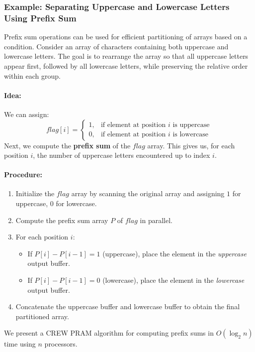 \documentclass[12pt]{book}
\begin{document}
\subsubsection{Example: Separating Uppercase and Lowercase Letters Using Prefix Sum}
Prefix sum operations can be used for efficient partitioning of arrays based on a condition.  
Consider an array of characters containing both uppercase and lowercase letters. The goal is to rearrange the array so that all uppercase letters appear first, followed by all lowercase letters, while preserving the relative order within each group.

\paragraph{Idea:}
We can assign:
\[
flag[i] =
\begin{cases}
1, & \text{if element at position $i$ is uppercase}\\
0, & \text{if element at position $i$ is lowercase}
\end{cases}
\]
Next, we compute the \textbf{prefix sum} of the $flag$ array. This gives us, for each position $i$, the number of uppercase letters encountered up to index $i$.

\paragraph{Procedure:}
\begin{enumerate}
    \item Initialize the $flag$ array by scanning the original array and assigning $1$ for uppercase, $0$ for lowercase.
    \item Compute the prefix sum array $P$ of $flag$ in parallel.
    \item For each position $i$:
        \begin{itemize}
            \item If $P[i]-P[i-1] = 1$ (uppercase), place the element in the \textit{uppercase} output buffer.
            \item If $P[i]-P[i-1] = 0$ (lowercase), place the element in the \textit{lowercase} output buffer.
        \end{itemize}
    \item Concatenate the uppercase buffer and lowercase buffer to obtain the final partitioned array.
\end{enumerate}

We present a CREW PRAM algorithm for computing prefix sums in $O(\log_2 n)$ time using $n$ processors.
\end{document}
